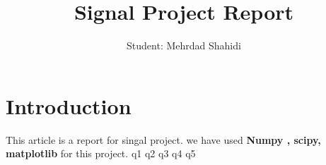\documentclass[12pt]{article}
\author{Student:\newline
Mehrdad Shahidi}
\title{Signal Project Report}
\begin{document}
\maketitle
\newpage

\tableofcontents
\newpage

\section{Introduction}
This article is a report for singal project. we have used \textbf{Numpy , scipy, matplotlib}
for this project.
{q1}
{q2}
{q3}
{q4}
{q5}
\end{document}
